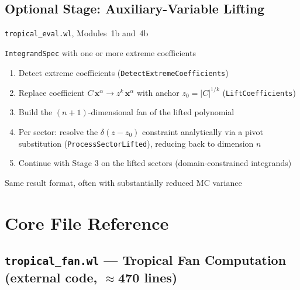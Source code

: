 \documentclass[11pt,a4paper]{article}
\begin{document}
\subsection{Optional Stage: Auxiliary-Variable Lifting}
\begin{description}[style=nextline]
  \item[Source:] \texttt{tropical\_eval.wl}, Modules~1b and~4b
  \item[Input:] \texttt{IntegrandSpec} with one or more extreme coefficients
  \item[Process:]
    \begin{enumerate}[label=(\alph*)]
      \item Detect extreme coefficients (\texttt{DetectExtremeCoefficients})
      \item Replace coefficient $C\,\mathbf{x}^\alpha \to z^k\,\mathbf{x}^\alpha$ with anchor $z_0 = |C|^{1/k}$ (\texttt{LiftCoefficients})
      \item Build the $(n{+}1)$-dimensional fan of the lifted polynomial
      \item Per sector: resolve the $\delta(z - z_0)$ constraint analytically via a pivot substitution (\texttt{ProcessSectorLifted}), reducing back to dimension $n$
      \item Continue with Stage 3 on the lifted sectors (domain-constrained integrands)
    \end{enumerate}
  \item[Output:] Same result format, often with substantially reduced MC variance
\end{description}

\section{Core File Reference}

\subsection{\texttt{tropical\_fan.wl} --- Tropical Fan Computation (external code, $\approx$470 lines)}
\end{document}
